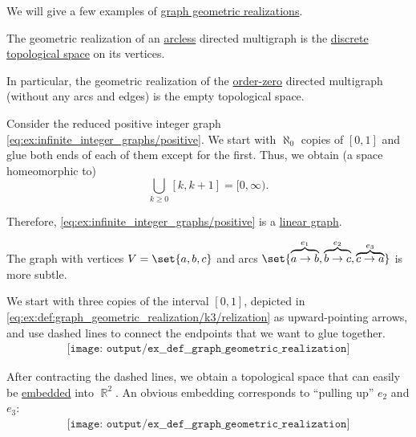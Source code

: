 \begin{example}\label{ex:def:graph_geometric_realization}
  We will give a few examples of \hyperref[def:graph_geometric_realization]{graph geometric realizations}.

  \begin{thmenum}
     The geometric realization of an \hyperref[rem:trivial_graph]{arcless} directed multigraph is the \hyperref[def:discrete_topology]{discrete topological space} on its vertices.

    In particular, the geometric realization of the \hyperref[rem:trivial_graph]{order-zero} directed multigraph (without any arcs and edges) is the empty topological space.

     Consider the reduced positive integer graph \eqref{eq:ex:infinite_integer_graphs/positive}. We start with \( \aleph_0 \) copies of \( [0, 1] \) and glue both ends of each of them except for the first. Thus, we obtain (a space homeomorphic to)
    \begin{equation*}
      \bigcup_{k \geq 0} [k, k + 1] = [0, \infty).
    \end{equation*}

    Therefore, \eqref{eq:ex:infinite_integer_graphs/positive} is a \hyperref[def:graph_geometric_realization/linear]{linear graph}.

     The graph with vertices \( V = \set{ a, b, c } \) and arcs \( \set{ \overbrace{a \to b}^{e_1}, \overbrace{b \to c}^{e_2}, \overbrace{c \to a}^{e_3} } \) is more subtle.

    We start with three copies of the interval \( [0, 1] \), depicted in \eqref{eq:ex:def:graph_geometric_realization/k3/relization} as upward-pointing arrows, and use dashed lines to connect the endpoints that we want to glue together.
    \begin{equation}\label{eq:ex:def:graph_geometric_realization/k3/relization}
      \begin{aligned}
        \texttt{[image: output/ex\_\_def\_\_graph\_geometric\_realization]}
      \end{aligned}
    \end{equation}

    After contracting the dashed lines, we obtain a topological space that can easily be \hyperref[def:graph_geometric_realization/embedding]{embedded} into \( \BbbR^2 \). An obvious embedding corresponds to \enquote{pulling up} \( e_2 \) and \( e_3 \):
    \begin{equation}\label{eq:ex:def:graph_geometric_realization/k3/embedding}
      \begin{aligned}
        \texttt{[image: output/ex\_\_def\_\_graph\_geometric\_realization]}
      \end{aligned}
    \end{equation}


\end{thmenum}
\end{example}
